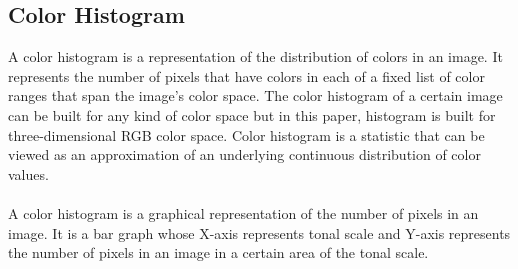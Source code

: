 \documentclass[pstricks,10pt]{report}
\begin{document}
\subsection{Color Histogram}
A color histogram is a representation of the distribution of colors in an image. It represents the number of pixels that have colors in each of a fixed list of color ranges that span the image’s color space. The color histogram of a certain image can be built for any kind of color space but in this paper, histogram is built for three-dimensional RGB color space. Color histogram is a statistic that can be viewed as an approximation of an underlying continuous distribution of color values.\\
\\
A color histogram is a graphical representation of the number of pixels in an image. It is a bar graph whose X-axis represents tonal scale and Y-axis represents the number of pixels in an image in a certain area of the tonal scale.\\
\end{document}
